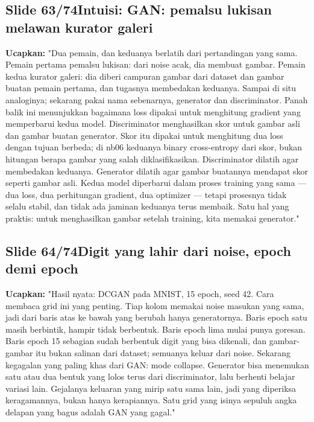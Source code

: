 \documentclass[11pt]{article}
\renewcommand{\framebox}[1]{\colorbox{acc!15}{\textcolor{acc}{\textbf{#1}}}}
\begin{document}
\subsection*{\framebox{Slide 63/74}\quad Intuisi: GAN: pemalsu lukisan melawan kurator galeri}
\textbf{Ucapkan:} "Dua pemain, dan keduanya berlatih dari pertandingan yang sama. Pemain pertama pemalsu lukisan: dari noise acak, dia membuat gambar. Pemain kedua kurator galeri: dia diberi campuran gambar dari dataset dan gambar buatan pemain pertama, dan tugasnya membedakan keduanya. Sampai di situ analoginya; sekarang pakai nama sebenarnya, generator dan discriminator. Panah balik ini menunjukkan bagaimana loss dipakai untuk menghitung gradient yang memperbarui kedua model. Discriminator menghasilkan skor untuk gambar asli dan gambar buatan generator. Skor itu dipakai untuk menghitung dua loss dengan tujuan berbeda; di nb06 keduanya binary cross-entropy dari skor, bukan hitungan berapa gambar yang salah diklasifikasikan. Discriminator dilatih agar membedakan keduanya. Generator dilatih agar gambar buatannya mendapat skor seperti gambar asli. Kedua model diperbarui dalam proses training yang sama --- dua loss, dua perhitungan gradient, dua optimizer --- tetapi prosesnya tidak selalu stabil, dan tidak ada jaminan keduanya terus membaik. Satu hal yang praktis: untuk menghasilkan gambar setelah training, kita memakai generator."\\[2pt]

\subsection*{\framebox{Slide 64/74}\quad Digit yang lahir dari noise, epoch demi epoch}
\textbf{Ucapkan:} "Hasil nyata: DCGAN pada MNIST, 15 epoch, seed 42. Cara membaca grid ini yang penting. Tiap kolom memakai noise masukan yang sama, jadi dari baris atas ke bawah yang berubah hanya generatornya. Baris epoch satu masih berbintik, hampir tidak berbentuk. Baris epoch lima mulai punya goresan. Baris epoch 15 sebagian sudah berbentuk digit yang bisa dikenali, dan gambar-gambar itu bukan salinan dari dataset; semuanya keluar dari noise. Sekarang kegagalan yang paling khas dari GAN: mode collapse. Generator bisa menemukan satu atau dua bentuk yang lolos terus dari discriminator, lalu berhenti belajar variasi lain. Gejalanya keluaran yang mirip satu sama lain, jadi yang diperiksa keragamannya, bukan hanya kerapiannya. Satu grid yang isinya sepuluh angka delapan yang bagus adalah GAN yang gagal."\\[2pt]
\end{document}
